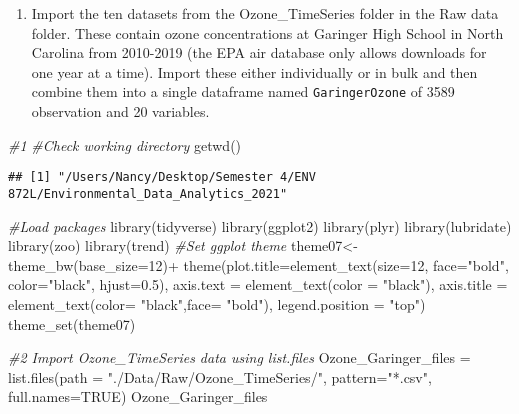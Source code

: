 \documentclass[
]{article}
\newenvironment{Shaded}{\begin{snugshade}}{\end{snugshade}}
\newcommand{\AttributeTok}[1]{\textcolor[rgb]{0.77,0.63,0.00}{#1}}
\newcommand{\CommentTok}[1]{\textcolor[rgb]{0.56,0.35,0.01}{\textit{#1}}}
\newcommand{\ConstantTok}[1]{\textcolor[rgb]{0.00,0.00,0.00}{#1}}
\newcommand{\DecValTok}[1]{\textcolor[rgb]{0.00,0.00,0.81}{#1}}
\newcommand{\FloatTok}[1]{\textcolor[rgb]{0.00,0.00,0.81}{#1}}
\newcommand{\FunctionTok}[1]{\textcolor[rgb]{0.00,0.00,0.00}{#1}}
\newcommand{\NormalTok}[1]{#1}
\newcommand{\OtherTok}[1]{\textcolor[rgb]{0.56,0.35,0.01}{#1}}
\newcommand{\SpecialCharTok}[1]{\textcolor[rgb]{0.00,0.00,0.00}{#1}}
\newcommand{\StringTok}[1]{\textcolor[rgb]{0.31,0.60,0.02}{#1}}
\providecommand{\tightlist}{%
  \setlength{\itemsep}{0pt}\setlength{\parskip}{0pt}}
\begin{document}
\begin{enumerate}
\def\labelenumi{\arabic{enumi}.}
\setcounter{enumi}{1}
\tightlist
\item
  Import the ten datasets from the Ozone\_TimeSeries folder in the Raw
  data folder. These contain ozone concentrations at Garinger High
  School in North Carolina from 2010-2019 (the EPA air database only
  allows downloads for one year at a time). Import these either
  individually or in bulk and then combine them into a single dataframe
  named \texttt{GaringerOzone} of 3589 observation and 20 variables.
\end{enumerate}

\begin{Shaded}
\begin{Highlighting}[]
\CommentTok{\#1}
\CommentTok{\#Check working directory}
\FunctionTok{getwd}\NormalTok{()}
\end{Highlighting}
\end{Shaded}

\begin{verbatim}
## [1] "/Users/Nancy/Desktop/Semester 4/ENV 872L/Environmental_Data_Analytics_2021"
\end{verbatim}

\begin{Shaded}
\begin{Highlighting}[]
\CommentTok{\#Load packages}
\FunctionTok{library}\NormalTok{(tidyverse)}
\FunctionTok{library}\NormalTok{(ggplot2)}
\FunctionTok{library}\NormalTok{(plyr)}
\FunctionTok{library}\NormalTok{(lubridate)}
\FunctionTok{library}\NormalTok{(zoo)}
\FunctionTok{library}\NormalTok{(trend)}
\CommentTok{\#Set ggplot theme}
\NormalTok{theme07}\OtherTok{\textless{}{-}}\FunctionTok{theme\_bw}\NormalTok{(}\AttributeTok{base\_size=}\DecValTok{12}\NormalTok{)}\SpecialCharTok{+}
           \FunctionTok{theme}\NormalTok{(}\AttributeTok{plot.title=}\FunctionTok{element\_text}\NormalTok{(}\AttributeTok{size=}\DecValTok{12}\NormalTok{, }
                                    \AttributeTok{face=}\StringTok{"bold"}\NormalTok{, }
                                    \AttributeTok{color=}\StringTok{"black"}\NormalTok{,}
                                    \AttributeTok{hjust=}\FloatTok{0.5}\NormalTok{),}
                 \AttributeTok{axis.text =} \FunctionTok{element\_text}\NormalTok{(}\AttributeTok{color =} \StringTok{"black"}\NormalTok{),}
                 \AttributeTok{axis.title =} \FunctionTok{element\_text}\NormalTok{(}\AttributeTok{color=} \StringTok{"black"}\NormalTok{,}\AttributeTok{face=} \StringTok{"bold"}\NormalTok{),}
                 \AttributeTok{legend.position =} \StringTok{"top"}\NormalTok{)}
\FunctionTok{theme\_set}\NormalTok{(theme07)}

\CommentTok{\#2 Import Ozone\_TimeSeries data using list.files }
\NormalTok{Ozone\_Garinger\_files }\OtherTok{=} \FunctionTok{list.files}\NormalTok{(}\AttributeTok{path =} \StringTok{"./Data/Raw/Ozone\_TimeSeries/"}\NormalTok{, }
                                  \AttributeTok{pattern=}\StringTok{"*.csv"}\NormalTok{, }\AttributeTok{full.names=}\ConstantTok{TRUE}\NormalTok{)}
\NormalTok{Ozone\_Garinger\_files}
\end{Highlighting}
\end{Shaded}
\end{document}
